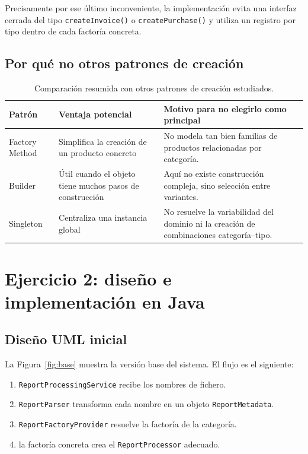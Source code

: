 \documentclass[12pt]{article}
\begin{document}
Precisamente por ese último inconveniente, la implementación evita una interfaz cerrada del tipo \texttt{createInvoice()} o \texttt{createPurchase()} y utiliza un registro por tipo dentro de cada factoría concreta.

\subsection{Por qué no otros patrones de creación}
\begin{table}[H]
\centering
\begin{tabular}{p{3cm}p{4.9cm}p{5.3cm}}
\toprule
Patrón & Ventaja potencial & Motivo para no elegirlo como principal \\
\midrule
Factory Method & Simplifica la creación de un producto concreto & No modela tan bien familias de productos relacionadas por categoría. \\
Builder & Útil cuando el objeto tiene muchos pasos de construcción & Aquí no existe construcción compleja, sino selección entre variantes. \\
Singleton & Centraliza una instancia global & No resuelve la variabilidad del dominio ni la creación de combinaciones categoría--tipo. \\
\bottomrule
\end{tabular}
\caption{Comparación resumida con otros patrones de creación estudiados.}
\end{table}

\section{Ejercicio 2: diseño e implementación en Java}
\subsection{Diseño UML inicial}
La Figura~\ref{fig:base} muestra la versión base del sistema. El flujo es el siguiente:

\begin{enumerate}[leftmargin=*]
  \item \texttt{ReportProcessingService} recibe los nombres de fichero.
  \item \texttt{ReportParser} transforma cada nombre en un objeto \texttt{ReportMetadata}.
  \item \texttt{ReportFactoryProvider} resuelve la factoría de la categoría.
  \item la factoría concreta crea el \texttt{ReportProcessor} adecuado.
\end{enumerate}
\end{document}
